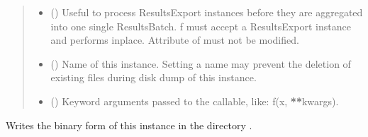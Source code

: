 \documentclass[letterpaper,10pt,english]{sphinxmanual}
\begin{document}
\begin{fulllineitems}
\begin{fulllineitems}
\begin{quote}
\begin{description}
\begin{itemize}
\item {} 
\sphinxAtStartPar
{} (\sphinxstyleliteralemphasis{\sphinxupquote{(}}\sphinxstyleliteralemphasis{\sphinxupquote{)}}\sphinxstyleliteralemphasis{\sphinxupquote{, }}) \textendash{} Useful to process ResultsExport instances before they are aggregated into one single ResultsBatch.
f must accept a ResultsExport instance and performs inplace.
Attribute  of  must not be modified.

\item {} 
\sphinxAtStartPar
{} (\sphinxstyleliteralemphasis{\sphinxupquote{, }}) \textendash{} Name of this instance.
Setting a name may prevent the deletion of existing files during disk dump of this instance.

\item {} 
\sphinxAtStartPar
{} () \textendash{} Keyword arguments passed to the  callable, like: f(x, {\color{red}\bfseries{}**}kwargs).

\end{itemize}

\sphinxAtStartPar
{}

\sphinxAtStartPar
{\hyperref[\detokenize{generated/tamos.data_IO.ResultsBatch:tamos.data_IO.ResultsBatch}]{}}

\end{description}\end{quote}

\end{fulllineitems}


\begin{fulllineitems}
\label{\detokenize{generated/tamos.data_IO.ResultsBatch:tamos.data_IO.ResultsBatch.dump_object}}
\pysigstartsignatures
{}
\pysigstopsignatures
\sphinxAtStartPar
Writes the binary form of this instance in the directory .


\end{fulllineitems}
\end{fulllineitems}
\end{document}
